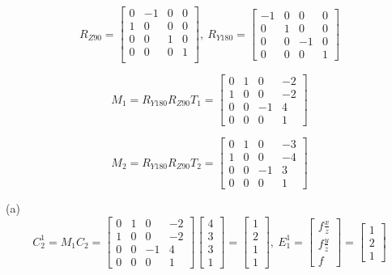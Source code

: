 \documentclass[12pt]{article}
\begin{document}
\begin{equation*}
R_{Z90}  = \left[ \begin{array}{cccc}
0 & -1 & 0 & 0\\
1 & 0 & 0 & 0\\
0 & 0 & 1 & 0\\
0 & 0 & 0 & 1\\
\end{array} \right],\ R_{Y180}  = \left[ \begin{array}{cccc}
-1& 0 & 0 & 0\\
0 & 1 & 0 & 0\\
0 & 0 & -1& 0\\
0 & 0 & 0 & 1
\end{array} \right]
\end{equation*}

\begin{equation*}
M_1 = R_{Y180} R_{Z90} T_1 = \left[ \begin{array}{cccc}
0 & 1 & 0 & -2\\
1 & 0 & 0 & -2\\
0 & 0 & -1 & 4\\
0 & 0 & 0 & 1
\end{array} \right]
\end{equation*}

\begin{equation*}
M_2 = R_{Y180} R_{Z90} T_2 = \left[ \begin{array}{cccc}
0 & 1 & 0 & -3\\
1 & 0 & 0 & -4\\
0 & 0 & -1 & 3\\
0 & 0 & 0 & 1
\end{array} \right]
\end{equation*}

\noindent (a) 
\begin{equation*}
C_2^1 = M_1C_2 = \left[ \begin{array}{cccc}
0 & 1 & 0 & -2\\
1 & 0 & 0 & -2\\
0 & 0 & -1 & 4\\
0 & 0 & 0 & 1
\end{array} \right] \left[ \begin{array}{c}
4\\
3\\
3\\
1
\end{array} \right] = \left[ \begin{array}{c}
1\\
2\\
1\\
1
\end{array} \right], \ E_1^1 = \left[ \begin{array}{c}
f\frac{x}{z}\\
f\frac{y}{z}\\
f
\end{array} \right]  = \left[ \begin{array}{c}
1\\
2\\
1
\end{array} \right]
\end{equation*}
\end{document}

